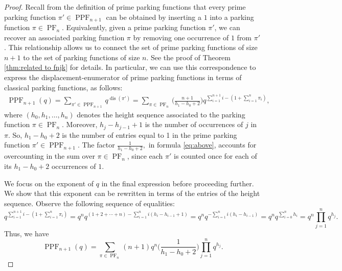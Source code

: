 \documentclass[12pt,reqno]{amsart}
\theoremstyle{definition}
\theoremstyle{remark}
\DeclareMathOperator{\PF}{PF}
\DeclareMathOperator{\PPF}{PPF}
\DeclareMathOperator{\disp}{dis} %
\begin{document}
\PPFDisplacementEnumerator*
\begin{proof}
Recall from the definition of prime parking functions that every prime parking function $\pi' \in \PPF_{n+1}$ can be obtained by inserting a $1$ into a parking function $\pi \in \PF_n$. Equivalently, given a prime parking function $\pi'$, we can recover an associated parking function $\pi$ by removing one occurrence of $1$ from $\pi'$. This relationship allows us to connect the set of prime parking functions of size $n+1$ to the set of parking functions of size $n$. See the proof of Theorem \ref{thm:related to fnjk} for details. In particular, we can use this correspondence to express the displacement-enumerator of prime parking functions in terms of classical parking functions, as follows:
\begin{align}
    \PPF_{n+1}(q)=\sum_{\pi' \in \PPF_{n+1}} q^{\disp(\pi')} = \sum_{\pi \in \PF_n} \Big( \frac{n+1}{h_1-h_0+2}  \Big) q^{\sum\limits_{i=1}^{n+1}i-(1+\sum\limits_{i=1}^{n}\pi_i)},\label{eq:above}
\end{align}
where \((h_0, h_1, \ldots, h_n)\) denotes the height sequence associated to the parking function \(\pi \in \PF_n\). Moreover, $h_j-h_{j-1}+1$ is the number of occurrences of $j$ in $\pi$. So,   \(h_1 - h_0 + 2\) is the number of entries equal to 1 in the prime parking function \(\pi' \in \PPF_{n+1}\).  The factor
$\frac{1}{h_1-h_0+2},$ in formula \eqref{eq:above}, accounts for overcounting in the sum over $\pi\in\PF_n$, since each $\pi'$ is counted once for each of its $h_1-h_0+2$ occurrences of $1$.

We focus on the exponent of \( q \) in the final expression before proceeding further. We show that this exponent can be rewritten in terms of the entries of the height sequence. Observe the following sequence of equalities:
$$
q^{\sum\limits_{i=1}^{n+1}i-(1+\sum\limits_{i=1}^{n}\pi_i)}
= q^n q^{(1+2+\cdots+ n) - \sum\limits_{i=1}^{n} i(h_i-h_{i-1}+1)}  = q^n q^{-\sum\limits_{i=1}^{n} i(h_i-h_{i-1})}  = q^n q^{\sum\limits_{i=0}^{n}h_i} = q^n \prod_{j=1}^{n}q^{h_{j}}.
$$
Thus, we have
\[
\PPF_{n+1}(q)= 
\sum_{\pi \in \PF_n} (n+1) q^n\Big( \frac{1}{h_1-h_0+2}  \Big) \prod_{j=1}^{n} q^{h_{j}}.
\]


\end{proof}
\end{document}
